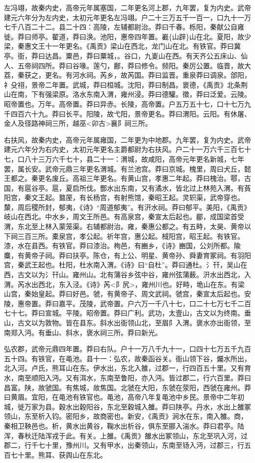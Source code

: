 \documentclass[]{article}
\begin{document}
左冯翊，故秦内史，高帝元年属塞国，二年更名河上郡，九年罢，复为内史。武帝建元六年分为左内史，太初元年更名左冯翊。户二十三万五千一百一，口九十一万七千八百二十二。县二十四：高陵，左辅都尉治。莽曰千春。栎阳，秦献公自雍徙。莽曰师亭。翟道，莽曰涣。池阳，惠帝四年置。嶻\{山辟\}山在北。夏阳，故少梁，秦惠文王十一年更名。《禹贡》梁山在西北，龙门山在北。有铁官。莽曰冀亭。衙，莽曰达昌。粟邑，莽曰粟城，。谷口，九嵏山在西。有天齐公五床山、仙人、五帝祠四所。莽曰谷喙。莲勺，鄜，莽曰修令。频阳。秦厉公置。临晋，故大荔，秦获之，更名。有河水祠。芮乡，故芮国。莽曰监晋。重泉莽曰调泉。郃阳，礻殳祤，景帝二年置。武城，莽曰桓城。沈阳，莽曰制昌。褱德，《禹贡》北条荆山在南，下有强梁原。洛水东南入渭，雍州浸。莽曰德驩。徵，莽曰泛爱。云陵。昭帝置也。万年。高帝置。莽曰异赤。长陵，高帝置。户五万五十七，口十七万九千四百六十九。莽曰长平。阳陵，故弋阳，景帝更名。莽曰渭阳。云阳。有休屠、金人及径路神祠三所，越巫\textless{}卯古\textgreater{}襄阝祠三所。

右扶风，故秦内史，高帝元年属雍国，二年更为中地郡。九年罢，复为内史。武帝建元六年分为右内史，太初元年更名主爵都尉为右扶风。户二十一万六千三百七十七，口八十三万六千七十，县二十一：渭城，故咸阳，高帝元年更名新城，七年罢，属长安。武帝元鼎三年更名渭城。有兰池宫。莽曰京城。槐里，周曰犬丘，懿王都之。秦更名废丘。高祖三年更名。有黄山宫，孝惠二年起。莽曰槐治。鄠，古国，有扈谷亭。扈，夏启所伐。酆水出东南，又有潏水，皆北过上林苑入渭。有萯阳宫，秦文王起。盩厔，有长杨宫，有射熊馆，秦昭王起。灵轵渠，武帝穿也。斄，周后稷所封，郁夷，《诗》``周道郁夷''。有汧水祠。莽曰郁平。美阳，《禹贡》岐山在西北。中水乡，周文王所邑。有高泉宫，秦宣太后起也。郿，成国梁首受渭，东北至上林入蒙笼渠。右辅都尉治。雍，秦惠公都之。有五畤，太昊、黄帝以下祠三百三所。橐泉宫，孝公起。祈年宫，惠公起。棫阳宫，昭王起。有铁官。漆，水在县西。有铁官。莽曰漆治。栒邑，有豳乡，《诗》豳国，公刘所都。隃麋，有黄帝子祠。莽曰扶亭。陈仓，有上公、明星、黄帝孙、舜妻育冢祠。有羽阳宫，秦武王起也。杜阳，杜水南入渭。《诗》曰``自杜''。莽曰通杜。氵幵，吴山在西，古文以为氵幵山。雍州山。北有蒲谷乡弦中谷，雍州弦蒲薮。汧水出西北，入渭。芮水出西北，东入泾。《诗》芮\textless{}阝尻\textgreater{}，雍州川也。好畤，垝山在东。有梁山宫，秦始皇起。莽曰好邑。虢，有黄帝子、周文武祠。虢宫，秦宣太后起也。安陵，惠帝置。莽曰嘉平。茂陵，武帝置。户六万一千八十七，口二十七万七千二百七十七。莽曰宣城。平陵。昭帝置。莽曰广利。武功，太壹山，古文以为终南。垂山，古文以为敦物。皆在县东。斜水出衙领山北，至眉阝入渭。褒水亦出衙领，至南郑入沔。有垂山、斜水，褒水祠三所。莽曰新光。

弘农郡，武帝元鼎四年置。莽曰右队。户十一万八千九十一，口四十七万五千九百五十四。有铁官，在黾池。县十一：弘农，故秦函谷关。衙山领下谷，爥水所出，北入河。卢氏，熊耳山在东。伊水出，东北入雒，过郡一，行四百五十里。又有育水，南至顺阳入沔。又有洱水，东南至鲁阳，亦入沔。皆过郡二，行六百里。莽曰昌富。陕，故虢国。有焦城，故焦国。北虢在大阳，东虢在荥阳，西虢在雍州。莽曰黄眉。宜阳，在黾池有铁官也。黾池，高帝八年复黾池中乡民。景帝中二年初城，徙万家为县。穀水出穀阳谷，东北至穀城入雒。莽曰陕亭。丹水，水出上雒冢领山，东至析入钧。密阳乡，故商密也。新安，《禹贡》涧水在东，南入雒。商，秦相卫鞅邑也。析，黄水出黄谷，鞠水出析谷，俱东至郦入湍水。莽曰君亭。陆浑，春秋迁陆浑戎于此。有关。上雒。《禹贡》雒水出冢领山，东北至巩入河，过郡二，行千七十里，豫州川。又有甲水，出秦领山，东南至钖入沔，过郡三，行五百七十里。熊耳、获舆山在东北。
\end{document}
